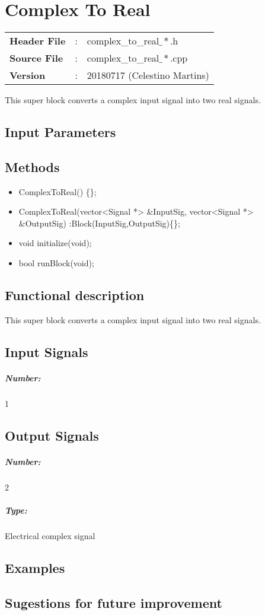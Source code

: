 \clearpage

\section{Complex To Real}

\begin{tcolorbox}	
	\begin{tabular}{p{2.75cm} p{0.2cm} p{10.5cm}} 	
		\textbf{Header File}   &:& complex\_to\_real$\_*$.h \\
		\textbf{Source File}   &:& complex\_to\_real$\_*$.cpp \\
        \textbf{Version}       &:& 20180717 (Celestino Martins) \\
	\end{tabular}
\end{tcolorbox}

This super block converts a complex input signal into two real signals.

\subsection*{Input Parameters}



\subsection*{Methods}

\begin{itemize}
  \item ComplexToReal() \{\};
  \item ComplexToReal(vector<Signal *> \&InputSig, vector<Signal *> \&OutputSig) :Block(InputSig,OutputSig)\{\};
  \item void initialize(void);
  \item bool runBlock(void);
\end{itemize}

\subsection*{Functional description}

This super block converts a complex input signal into two real signals.


\pagebreak
\subsection*{Input Signals}

\subparagraph*{Number:} 1

\subsection*{Output Signals}

\subparagraph*{Number:} 2

\subparagraph*{Type:} Electrical complex signal

\subsection*{Examples}

\subsection*{Sugestions for future improvement}


